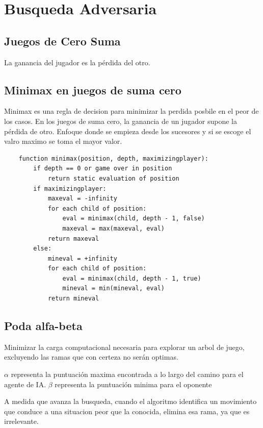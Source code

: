 \section{Busqueda Adversaria}
\subsection{Juegos de Cero Suma}
La ganancia del jugador es la pérdida del otro.

\subsection{Minimax en juegos de suma cero}
Minimax es una regla de decision para minimizar la perdida posbile en el peor de los casos. En los juegos de suma cero, la ganancia de un jugador supone la pérdida de otro.
Enfoque donde se empieza desde los sucesores y si se escoge el valro maximo se toma el mayor valor.

\begin{lstlisting}
    function minimax(position, depth, maximizingplayer):
        if depth == 0 or game over in position
            return static evaluation of position
        if maximizingplayer:
            maxeval = -infinity
            for each child of position:
                eval = minimax(child, depth - 1, false)
                maxeval = max(maxeval, eval)
            return maxeval
        else:
            mineval = +infinity
            for each child of position:
                eval = minimax(child, depth - 1, true)
                mineval = min(mineval, eval)
            return mineval
\end{lstlisting}

\subsection{Poda alfa-beta}
Minimizar la carga computacional necesaria para explorar un arbol de juego, excluyendo las ramas que con certeza no serán optimas.

$\alpha$ representa la puntuación maxima encontrada a lo largo del camino para el agente de IA.
$\beta$ representa la puntuación minima para el oponente

A medida que avanza la busqueda, cuando el algoritmo identifica un movimiento que conduce a una situacion peor que la conocida,
elimina esa rama, ya que es irrelevante.

